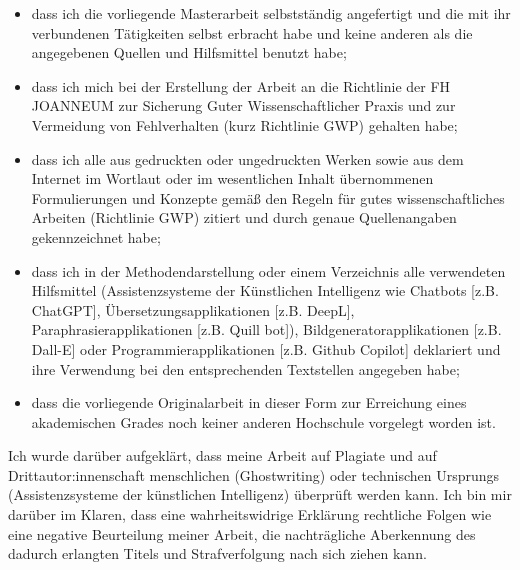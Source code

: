 {\begin{itemize}
    \item dass ich die vorliegende Masterarbeit selbstständig angefertigt und die mit ihr verbundenen Tätigkeiten selbst erbracht habe und keine anderen als die angegebenen Quellen und Hilfsmittel benutzt habe;
    \item dass ich mich bei der Erstellung der Arbeit an die Richtlinie der FH JOANNEUM zur Sicherung Guter Wissenschaftlicher Praxis und zur Vermeidung von Fehlverhalten (kurz Richtlinie GWP) gehalten habe;
    \item dass ich alle aus gedruckten oder ungedruckten Werken sowie aus dem Internet im Wortlaut oder im wesentlichen Inhalt übernommenen Formulierungen und Konzepte gemäß den Regeln für gutes wissenschaftliches Arbeiten (Richtlinie GWP) zitiert und durch genaue Quellenangaben gekennzeichnet habe;
    \item dass ich in der Methodendarstellung oder einem Verzeichnis alle verwendeten Hilfsmittel (Assistenzsysteme der Künstlichen Intelligenz wie Chatbots [z.B. ChatGPT], Übersetzungsapplikationen [z.B. DeepL], Paraphrasierapplikationen [z.B. Quill bot]), Bildgeneratorapplikationen [z.B. Dall-E] oder Programmierapplikationen [z.B. Github Copilot] deklariert und ihre Verwendung bei den entsprechenden Textstellen angegeben habe;
    \item dass die vorliegende Originalarbeit in dieser Form zur Erreichung eines akademischen Grades noch keiner anderen Hochschule vorgelegt worden ist.
\end{itemize}

Ich wurde darüber aufgeklärt, dass meine Arbeit auf Plagiate und auf Drittautor:innenschaft menschlichen (Ghostwriting) oder technischen Ursprungs (Assistenzsysteme der künstlichen Intelligenz) überprüft werden kann. Ich bin mir darüber im Klaren, dass eine wahrheitswidrige Erklärung rechtliche Folgen wie eine negative Beurteilung meiner Arbeit, die nachträgliche Aberkennung des dadurch erlangten Titels und Strafverfolgung nach sich ziehen kann.

}